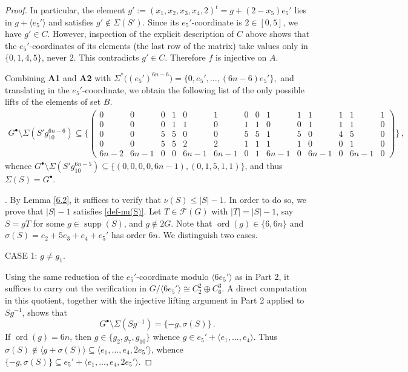 \documentclass[10pt,a4paper]{amsart}
\DeclareMathOperator{\ord}{ord}
\DeclareMathOperator{\supp}{supp}
\begin{document}
\begin{proof}
	In particular, the element
	$g' := (x_1, x_2, x_3, x_4, 2)^t = g + (2 - x_5) e_5'$
	lies in $g + \langle e_5'\rangle$ and satisfies $g' \notin \Sigma(S')$.
	Since its $e_5'$-coordinate is $2 \in [0, 5]$, we have
	$g' \in C$. However, inspection of the explicit description
	of $C$ above shows that the $e_5'$-coordinates of its
	elements (the last row of the matrix) take values only in
	$\{0, 1, 4, 5\}$, never $2$. This contradicts $g' \in C$.
	Therefore $f$ is injective on $A$.


\medskip
Combining {\bf A1} and {\bf A2} with
$
\Sigma^*\bigl((e_5')^{6n-6}\bigr)
=\{0,e_5',\ldots,(6n-6)e_5'\},
$
and translating in the $e_5'$-coordinate, we obtain the following
list of the only possible lifts of the elements of set $B$.
\begin{align*}
G^{\bullet} \setminus \Sigma (S'g_{10}^{6n-6}) \subseteq
\{\left(\begin{array}{l|l|l|l|l|l|l|l|l|l|l|l|l|l}
	0 & 0 & 0 & 1 & 0 & 1 & 0 & 0 & 1 & 1 & 1 & 1 & 1 & 1\\
	0 & 0 & 0 & 1 & 1 & 0 & 1 & 1 & 0 & 0 & 1 & 1 & 1 & 0\\
	0 & 0 & 5 & 5 & 0 & 0 & 5 & 5 & 1 & 5 & 0 & 4 & 5 & 0\\
	0 & 0 & 5 & 5 & 2 & 2 & 1 & 1 & 1 & 1 & 0 & 0 & 1 & 0\\
	6n-2 & 6n-1 & 0 & 0 & 6n-1 & 6n-1 & 0 & 1 & 6n-1 & 0 & 6n-1 & 0 & 6n-1 & 0
\end{array}\right)
\} \,,
\end{align*}
whence $G^{\bullet} \setminus \Sigma (S'g_{10}^{6n-5})\subseteq \{(0,0,0,0,6n-1),(0,1,5,1,1)\}$, and thus $\Sigma(S)=G^{\bullet}$. 

. By Lemma \ref{6.2}, it suffices to verify that  $\nu (S) \le |S|-1$. In order to do so, we prove that
$|S| - 1$ satisfies \eqref{def-nu(S)}. Let $T \in \mathcal F (G)$ with $|T|=|S|-1$, say $S = gT$ for some $g \in \supp (S)$, and $g\notin 2G$.  Note that $\ord(g) \in \{6, 6n\}$  and  $\sigma(S) = e_2 + 5e_3 + e_4+e_5'$ has order $6n$. We distinguish two cases.

\smallskip
\noindent
CASE 1: $g \neq g_1$.

Using the same reduction of the $e_5'$-coordinate modulo
$\langle 6e_5'\rangle$ as in Part 2, it suffices to carry out the
verification in $
G/\langle 6e_5'\rangle\cong C_2^2\oplus C_6^3.$
A direct computation in this quotient, together with the injective lifting argument in Part 2 applied to $Sg^{-1}$, shows that 
\[
	G^{\bullet} \setminus \Sigma(Sg^{-1})=\{-g, \sigma (S) \} \,.
\]
If $\ord(g)=6n$, then $g\in\{g_2,g_7,g_{10} \}$ whence $g \in e_5'+\langle e_1,...,e_4\rangle$. Thus $\sigma (S) \notin \langle g+ \sigma (S) \rangle \subseteq \langle e_1,...,e_4,2e_5'\rangle$, whence $\{-g, \sigma (S) \} \subseteq e_5' + \langle e_1,...,e_4,2e_5'\rangle$.
		

\end{proof}
\end{document}
